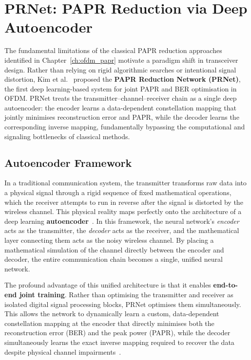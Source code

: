 \chapter{PRNet: PAPR Reduction via Deep Autoencoder}
\label{ch:prnet}

The fundamental limitations of the classical PAPR reduction approaches identified in Chapter~\ref{ch:ofdm_papr} motivate a paradigm shift in transceiver design. Rather than relying on rigid algorithmic searches or intentional signal distortion, Kim et al.~\cite{kim2017novel} proposed the \textbf{PAPR Reduction Network (PRNet)}, the first deep learning-based system for joint PAPR and BER optimisation in OFDM. PRNet treats the transmitter--channel--receiver chain as a single deep autoencoder: the encoder learns a data-dependent constellation mapping that jointly minimises reconstruction error and PAPR, while the decoder learns the corresponding inverse mapping, fundamentally bypassing the computational and signaling bottlenecks of classical methods.

\section{Autoencoder Framework}
\label{sec:autoencoder_framework}

In a traditional communication system, the transmitter transforms raw data into a physical signal through a rigid sequence of fixed mathematical operations, which the receiver attempts to run in reverse after the signal is distorted by the wireless channel. This physical reality maps perfectly onto the architecture of a deep learning \textbf{autoencoder}~\cite{kim2017novel}. In this framework, the neural network's \emph{encoder} acts as the transmitter, the \emph{decoder} acts as the receiver, and the mathematical layer connecting them acts as the noisy wireless channel. By placing a mathematical simulation of the channel directly between the encoder and decoder, the entire communication chain becomes a single, unified neural network.

The profound advantage of this unified architecture is that it enables \textbf{end-to-end joint training}. Rather than optimising the transmitter and receiver as isolated digital signal processing blocks, PRNet optimises them simultaneously. This allows the network to dynamically learn a custom, data-dependent constellation mapping at the encoder that directly minimises both the reconstruction error (BER) and the peak power (PAPR), while the decoder simultaneously learns the exact inverse mapping required to recover the data despite physical channel impairments~\cite{kim2017novel}.


